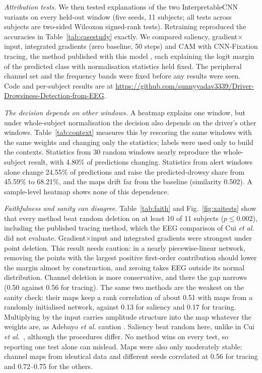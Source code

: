 \textit{Attribution tests.} We then tested explanations of the two InterpretableCNN variants on every held-out window (five seeds, 11 subjects; all tests across subjects are two-sided Wilcoxon signed-rank tests). Retraining reproduced the accuracies in Table~\ref{tab:casestudy} exactly. We compared saliency, gradient$\times$input, integrated gradients (zero baseline, 50 steps) and CAM with CNN-Fixation tracing, the method published with this model \cite{cui2022eeg}, each explaining the logit margin of the predicted class with normalisation statistics held fixed. The peripheral channel set and the frequency bands were fixed before any results were seen. Code and per-subject results are at \url{https://github.com/sunnyyadav3339/Driver-Drowsiness-Detection-from-EEG}. 

\textit{The decision depends on other windows.} A heatmap explains one window, but under whole-subject normalisation the decision also depends on the driver's other windows. Table~\ref{tab:context} measures this by rescoring the same windows with the same weights and changing only the statistics; labels were used only to build the contexts. Statistics from 30 random windows nearly reproduce the whole-subject result, with 4.80\% of predictions changing. Statistics from alert windows alone change 24.55\% of predictions and raise the predicted-drowsy share from 45.59\% to 68.21\%, and the maps drift far from the baseline (similarity 0.502). A sample-level heatmap shows none of this dependence.

\textit{Faithfulness and sanity can disagree.} Table~\ref{tab:faith} and Fig.~\ref{fig:xaitests} show that every method beat random deletion on at least 10 of 11 subjects ($p \le 0.002$), including the published tracing method, which the EEG comparison of Cui \textit{et al.}~\cite{cui2023towards} did not evaluate. Gradient$\times$input and integrated gradients were strongest under point deletion. This result needs caution: in a nearly piecewise-linear network, removing the points with the largest positive first-order contribution should lower the margin almost by construction, and zeroing takes EEG outside its normal distribution. Channel deletion is more conservative, and there the gap narrows (0.50 against 0.56 for tracing). The same two methods are the weakest on the sanity check: their maps keep a rank correlation of about 0.51 with maps from a randomly initialised network, against 0.13 for saliency and 0.17 for tracing. Multiplying by the input carries amplitude structure into the map whatever the weights are, as Adebayo \textit{et al.} caution \cite{adebayo2018sanity}. Saliency beat random here, unlike in Cui \textit{et al.}~\cite{cui2023towards}, although the procedures differ. No method wins on every test, so reporting one test alone can mislead. Maps were also only moderately stable: channel maps from identical data and different seeds correlated at 0.56 for tracing and 0.72--0.75 for the others.

